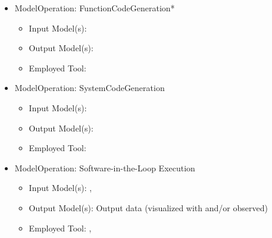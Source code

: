 
\begin{itemize}
    \item ModelOperation: FunctionCodeGeneration*
    \begin{itemize}
        \item Input Model(s): \CPSLabControlModel
        \item Output Model(s): \CPSLabControlModelCode
        \item Employed Tool: \dSPACETargetLink %
    \end{itemize}
    \item ModelOperation: SystemCodeGeneration
    \begin{itemize}
        \item Input Model(s): \CPSLabSystemModel
        \item Output Model(s): \CPSLabSystemModelCode
        \item Employed Tool: \dSPACESystemDesk %
    \end{itemize}
    \item ModelOperation: Software-in-the-Loop Execution
    \begin{itemize}
        \item Input Model(s): \CPSLabControlModelCode*, \CPSLabSystemModelCode
        \item Output Model(s): Output data (visualized with \MATLABSimulinkSimulator and/or observed)
        \item Employed Tool: \RobotExecutionRemote, \DesktopExecution %
    \end{itemize}
\end{itemize}

 


